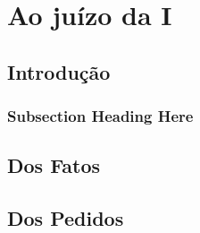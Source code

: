 \documentclass[
  12pt,
	oneside,
	a4paper,
	english,			%
	french,				%
	spanish,			%
  brazil
]{memoir}
\begin{document}
\chapter{Ao juízo da I}
\section{Introdução}
\lipsum[1-3]

\subsection{Subsection Heading Here}
\lipsum[1-2]

\section{Dos Fatos}
\lipsum[2-8]

\section{Dos Pedidos}
\lipsum[1-3]
\end{document}
